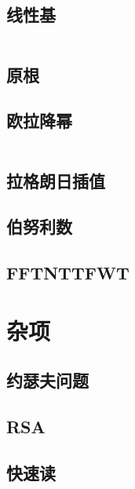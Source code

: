 \documentclass[a4paper,11pt]{article}
\begin{document}
    \subsection{线性基}
    \inputminted[breaklines]{c++}{Math/线性基.cpp}

    \subsection{原根}
    

    \subsection{欧拉降幂}
    \inputminted[breaklines]{c++}{Math/欧拉降幂.cpp}

    \subsection{拉格朗日插值}
    

    \subsection{伯努利数}
    

    \subsection{FFTNTTFWT}
    


    \newpage
    \section{杂项}

    \subsection{约瑟夫问题}
    

    \subsection{RSA}
    

    \subsection{快速读}
    \inputminted[breaklines]{c++}{Others/quick_IO.cpp}
\end{document}
